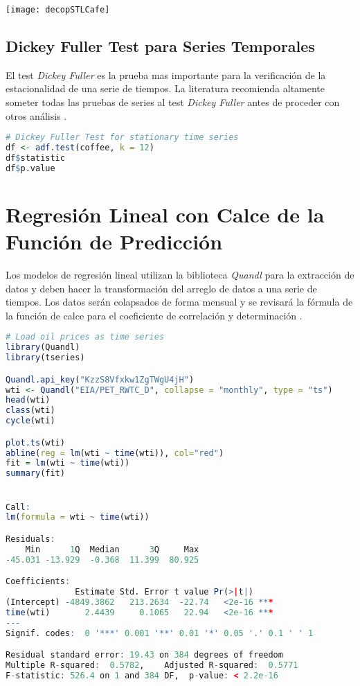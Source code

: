 \texttt{[image: decopSTLCafe]}\\

\subsection{Dickey Fuller Test para Series Temporales}
El test \emph{Dickey Fuller} \cite{dickeyfuller} es la prueba mas importante para la verificación de la estacionalidad de una serie de tiempos. La literatura recomienda altamente someter todas las pruebas de series al test \emph{Dickey Fuller} antes de proceder con otros análisis \cite{hyndman}.

\begin{lstlisting}[language=R]
# Dickey Fuller Test for stationary time series
df <- adf.test(coffee, k = 12)
df$statistic
df$p.value
\end{lstlisting}

\section{Regresión Lineal con Calce de la Función de Predicción}
Los modelos de regresión lineal utilizan la biblioteca \emph{Quandl} para la extracción de datos y deben hacer la transformación del arreglo de datos a una serie de tiempos. Los datos serán colapsados de forma mensual y se revisará la fórmula de la función de calce para el coeficiente de correlación y determinación \cite{narayanachar}. 

\begin{lstlisting}[language=R]
# Load oil prices as time series
library(Quandl)
library(tseries)

Quandl.api_key("KzzS8Vfxkw1ZgTWgU4jH")
wti <- Quandl("EIA/PET_RWTC_D", collapse = "monthly", type = "ts")
head(wti)
class(wti)
cycle(wti)

plot.ts(wti)
abline(reg = lm(wti ~ time(wti)), col="red")
fit = lm(wti ~ time(wti))
summary(fit)


Call:
lm(formula = wti ~ time(wti))

Residuals:
    Min      1Q  Median      3Q     Max 
-45.031 -13.929  -0.368  11.399  80.925 

Coefficients:
              Estimate Std. Error t value Pr(>|t|)    
(Intercept) -4849.3862   213.2634  -22.74   <2e-16 ***
time(wti)       2.4439     0.1065   22.94   <2e-16 ***
---
Signif. codes:  0 '***' 0.001 '**' 0.01 '*' 0.05 '.' 0.1 ' ' 1

Residual standard error: 19.43 on 384 degrees of freedom
Multiple R-squared:  0.5782,	Adjusted R-squared:  0.5771 
F-statistic: 526.4 on 1 and 384 DF,  p-value: < 2.2e-16
\end{lstlisting}

